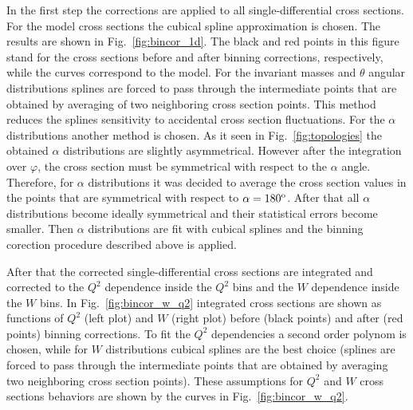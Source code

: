 In the first step the corrections  are
applied to all single-differential cross
sections. For the model cross sections the cubical spline 
approximation is chosen. The results are shown in Fig.~\ref{fig:bincor_1d}. The black and red points in this figure stand for the cross sections before and after binning corrections, respectively, while the curves correspond to the model.
For the invariant masses and $\theta$ angular distributions splines are forced to pass through the intermediate points that are obtained by averaging of two neighboring cross section points. This method reduces the splines sensitivity to accidental cross section fluctuations.
For the $\alpha$ distributions another method is chosen.
As it seen in Fig.~\ref{fig:topologies} the obtained $\alpha$ distributions are slightly asymmetrical. However  after the integration over $\varphi$, the cross section must be symmetrical with respect to the $\alpha$ angle.
Therefore, for $\alpha$ distributions it was decided to average the cross section values in the points that are symmetrical with respect to $\alpha = 180^{\rm o}$. After that all $\alpha$ distributions become ideally symmetrical and their statistical errors become smaller. Then $\alpha$ distributions are fit with cubical splines and the binning corection procedure described above is applied.





After that the corrected single-differential cross sections are
integrated and corrected to the $Q^{2}$ dependence
inside the $Q^{2}$ bins and the  $W$ dependence  inside the $W$ bins.
In Fig.~\ref{fig:bincor_w_q2} integrated cross sections are shown as  functions of $Q^{2}$ (left plot) and $W$ (right plot) before (black points) and after (red points) binning corrections. 
To fit the $Q^{2}$ dependencies a second order polynom is chosen, while for $W$ distributions cubical splines  are the best choice (splines are forced to pass through the intermediate points that are obtained by averaging two neighboring cross section points).
These assumptions for $Q^{2}$ and $W$ cross sections behaviors are shown by the curves in Fig.~\ref{fig:bincor_w_q2}. 

